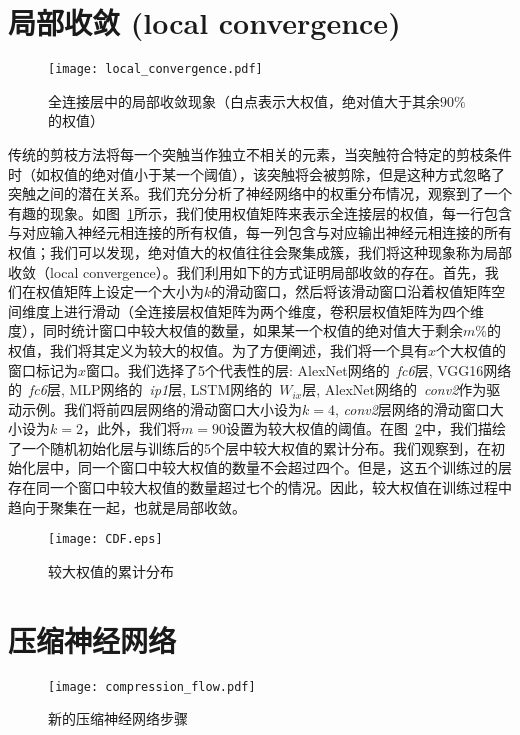 \section{局部收敛 (local convergence)}

\begin{figure}[h]
  \centering
  \texttt{[image: local\_convergence.pdf]}
  \caption{全连接层中的局部收敛现象（白点表示大权值，绝对值大于其余$90\%$的权值）}
  \label{fig:local_convergence}
\end{figure}

传统的剪枝方法将每一个突触当作独立不相关的元素，当突触符合特定的剪枝条件时（如权值的绝对值小于某一个阈值），该突触将会被剪除，但是这种方式忽略了突触之间的潜在关系。我们充分分析了神经网络中的权重分布情况，观察到了一个有趣的现象。如图~\ref{fig:local_convergence}所示，我们使用权值矩阵来表示全连接层的权值，每一行包含与对应输入神经元相连接的所有权值，每一列包含与对应输出神经元相连接的所有权值；我们可以发现，绝对值大的权值往往会聚集成簇，我们将这种现象称为局部收敛（local convergence）。我们利用如下的方式证明局部收敛的存在。首先，我们在权值矩阵上设定一个大小为$k$的滑动窗口，然后将该滑动窗口沿着权值矩阵空间维度上进行滑动（全连接层权值矩阵为两个维度，卷积层权值矩阵为四个维度），同时统计窗口中较大权值的数量，如果某一个权值的绝对值大于剩余$m\%$的权值，我们将其定义为较大的权值。为了方便阐述，我们将一个具有$x$个大权值的窗口标记为$x$窗口。我们选择了5个代表性的层: AlexNet网络的~\emph{fc6}层, VGG16网络的~\emph{fc6}层, MLP网络的~\emph{ip1}层, LSTM网络的~\emph{$W_{ix}$}层, AlexNet网络的~\emph{conv2}作为驱动示例。我们将前四层网络的滑动窗口大小设为$k = 4$, \emph{conv2}层网络的滑动窗口大小设为$k = 2$，此外，我们将$m = 90$设置为较大权值的阈值。在图~\ref{fig:cdf}中，我们描绘了一个随机初始化层与训练后的5个层中较大权值的累计分布。我们观察到，在初始化层中，同一个窗口中较大权值的数量不会超过四个。但是，这五个训练过的层存在同一个窗口中较大权值的数量超过七个的情况。因此，较大权值在训练过程中趋向于聚集在一起，也就是局部收敛。

\begin{figure}[t]
\centering
\texttt{[image: CDF.eps]}
\caption{较大权值的累计分布}
\label{fig:cdf}
\end{figure}

\section{压缩神经网络}

\begin{figure}[h]
\centering
\texttt{[image: compression\_flow.pdf]}
\caption{新的压缩神经网络步骤}
\label{fig:compression_flow}
\end{figure}

